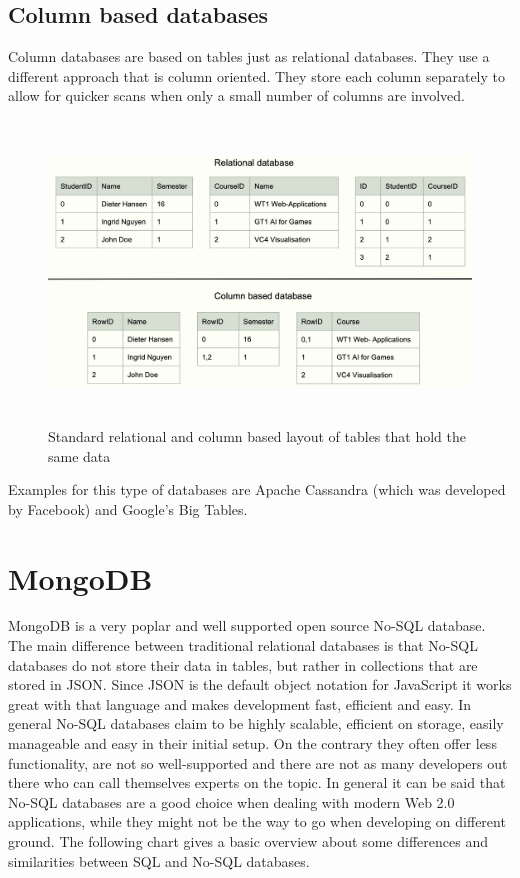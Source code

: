 \documentclass[11pt]{article}
\begin{document}
\subsection{Column based databases}
Column databases are based on tables just as relational databases. They use a different approach that is column oriented.
They store each column separately to allow for quicker scans when only a small number of columns are involved. 
\cite{columnbased} 
\begin{figure}[H]
	\centering 
	\includegraphics[height=8cm]{figures/column_based}     
	\caption{Standard relational and column based layout of tables that hold the same data}          
\end{figure}   
Examples for this type of databases are Apache Cassandra (which was developed by Facebook) and Google's Big Tables.
\section{MongoDB} 
MongoDB is a very poplar and well supported open source No-SQL database. The main difference between traditional relational databases is that No-SQL databases do not store their data in tables, but rather in collections that are stored in JSON. Since JSON is the default object notation for JavaScript it works great with that language and makes development fast, efficient and easy. In general No-SQL databases claim to be highly scalable, efficient on storage, easily manageable and easy in their initial setup. On the contrary they often offer less functionality, are not so well-supported and there are not as many developers out there who can call themselves experts on the topic. 
	In general it can be said that No-SQL databases are a good choice when dealing with modern Web 2.0 applications, while they might not be the way to go when developing on different ground. \cite{nosqladvantages} The following chart gives a basic overview about some differences and similarities between SQL and No-SQL databases. 
	
\end{document}
